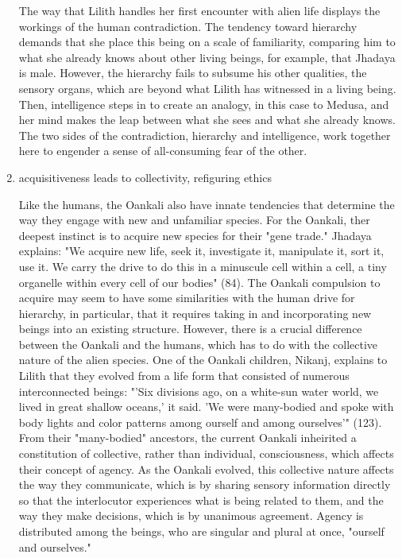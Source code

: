 \documentclass[11pt]{article}
\begin{document}
\begin{enumerate}
The way that Lilith handles her first encounter with alien life
displays the workings of the human contradiction. The tendency toward
hierarchy demands that she place this being on a scale of familiarity,
comparing him to what she already knows about other living beings, for
example, that Jhadaya is male. However, the hierarchy fails to subsume
his other qualities, the sensory organs, which are beyond what Lilith
has witnessed in a living being. Then, intelligence steps in to create
an analogy, in this case to Medusa, and her mind makes the leap
between what she sees and what she already knows. The two sides of the
contradiction, hierarchy and intelligence, work together here to
engender a sense of all-consuming fear of the other. 

\item acquisitiveness leads to collectivity, refiguring ethics
\label{sec:org5139944}

Like the humans, the Oankali also have innate tendencies that
determine the way they engage with new and unfamiliar species. For the
Oankali, ther deepest instinct is to acquire new species for their
"gene trade." Jhadaya explains: "We acquire new life, seek it,
investigate it, manipulate it, sort it, use it. We carry the drive to
do this in a minuscule cell within a cell, a tiny organelle within
every cell of our bodies" (84). The Oankali compulsion to acquire may
seem to have some similarities with the human drive for hierarchy, in
particular, that it requires taking in and incorporating new beings
into an existing structure. However, there is a crucial difference
between the Oankali and the humans, which has to do with the
collective nature of the alien species. One of the Oankali children,
Nikanj, explains to Lilith that they evolved from a life form that
consisted of numerous interconnected beings: "'Six divisions ago, on a
white-sun water world, we lived in great shallow oceans,' it said. 'We
were many-bodied and spoke with body lights and color patterns among
ourself and among ourselves'" (123). From their "many-bodied"
ancestors, the current Oankali inheirited a constitution of
collective, rather than individual, consciousness, which affects their
concept of agency. As the Oankali evolved, this collective nature
affects the way they communicate, which is by sharing sensory
information directly so that the interlocutor experiences what is
being related to them, and the way they make decisions, which is by
unanimous agreement. Agency is distributed among the beings, who are
singular and plural at once, "ourself and ourselves."


\end{enumerate}
\end{document}
